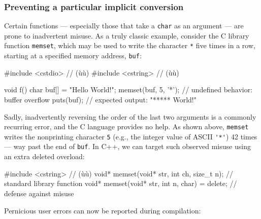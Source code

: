 \subsubsection[Preventing a particular implicit conversion]{Preventing a particular implicit conversion}\label{preventing-a-particular-implicit-conversion}

Certain functions --- especially those that take a \lstinline!char! as an
argument --- are prone to inadvertent misuse. As a truly classic
example, consider the C library function \lstinline!memset!, which may be used
to write the character \lstinline!*! five times in a row, starting at a
specified memory address, \lstinline!buf!:

%
\begin{emcppslisting}
#include <cstdio>  // (ù{}ù)
#include <cstring> // (ù{}ù)

void f()
{
    char buf[] = "Hello World!";
    memset(buf, 5, '*');  // undefined behavior: buffer overflow
    puts(buf);            // expected output: "***** World!"
}
\end{emcppslisting}


\noindent Sadly, inadvertently reversing the order of the last two arguments is a commonly
recurring error, and the C language provides no help. As shown above, \lstinline!memset! writes the nonprinting character \lstinline!5! (e.g., the integer value of ASCII \lstinline!'*'!) 42 times --- way past the end of \lstinline!buf!. In C++, we
can target such observed misuse using an extra deleted overload:

\begin{emcppslisting}
#include <cstring>  // (ù{}ù)
void* memset(void* str, int ch, size_t n);      // standard library function
void* memset(void* str, int n, char) = delete;  // defense against misuse
\end{emcppslisting}

\noindent Pernicious user errors can now be reported during compilation:

